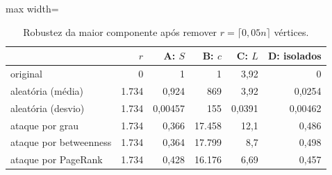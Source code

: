 \begin{table}[t]
\centering
\small
\caption{Robustez da maior componente após remover $r=\lceil 0{,}05n \rceil$ vértices.}
\label{tab:robustez}
\begin{adjustbox}{max width=\linewidth}
\begin{tabular}{lrrrrr}
\toprule
 & $r$ & A: $S$ & B: $c$ & C: $L$ & D: isolados \\
\midrule
original & 0 & 1 & 1 & 3,92 & 0 \\
aleatória (média) & 1.734 & 0,924 & 869 & 3,92 & 0,0254 \\
aleatória (desvio) & 1.734 & 0,00457 & 155 & 0,0391 & 0,00462 \\
ataque por grau & 1.734 & 0,366 & 17.458 & 12,1 & 0,486 \\
ataque por betweenness & 1.734 & 0,364 & 17.799 & 8,7 & 0,498 \\
ataque por PageRank & 1.734 & 0,428 & 16.176 & 6,69 & 0,457 \\
\bottomrule
\end{tabular}
\end{adjustbox}
\end{table}
